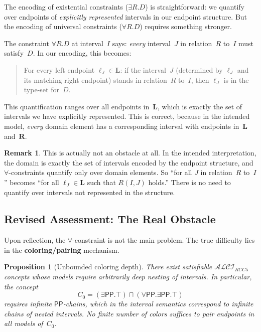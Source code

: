 \documentclass[a4paper,11pt]{article}
\newtheorem{proposition}[theorem]{Proposition}
\theoremstyle{definition}
\newtheorem{remark}[theorem]{Remark}
\newcommand{\ALCIRCC}[1]{\ensuremath{\mathcal{ALCI}_{\mathit{RCC#1}}}}
\newcommand{\PP}{\ensuremath{\mathsf{PP}}}
\begin{document}
The encoding of existential constraints ($\exists R.D$) is
straightforward: we quantify over endpoints of \emph{explicitly
represented} intervals in our endpoint structure.  But the encoding
of universal constraints ($\forall R.D$) requires something stronger.

The constraint $\forall R.D$ at interval~$I$ says: \emph{every}
interval~$J$ in relation~$R$ to~$I$ must satisfy~$D$.  In our
encoding, this becomes:

\begin{quote}
For every left endpoint $\ell_J \in \mathbf{L}$: if the interval~$J$
(determined by $\ell_J$ and its matching right endpoint) stands
in relation~$R$ to~$I$, then $\ell_J$ is in the type-set
for~$D$.
\end{quote}

This quantification ranges over all endpoints in~$\mathbf{L}$, which
is exactly the set of intervals we have explicitly represented.  This
is correct, because in the intended model, \emph{every} domain
element has a corresponding interval with endpoints in~$\mathbf{L}$
and~$\mathbf{R}$.

\begin{remark}
This is actually not an obstacle at all.  In the intended
interpretation, the domain is exactly the set of intervals encoded
by the endpoint structure, and $\forall$-constraints quantify only
over domain elements.  So ``for all $J$ in relation~$R$ to~$I$''
becomes ``for all $\ell_J \in \mathbf{L}$ such that $R(I,J)$
holds.''  There is no need to quantify over intervals not
represented in the structure.
\end{remark}

\subsection{Revised Assessment: The Real Obstacle}
\label{sec:real-obstacle}

Upon reflection, the $\forall$-constraint is not the main problem.
The true difficulty lies in the \textbf{coloring/pairing} mechanism.

\begin{proposition}[Unbounded coloring depth]
\label{prop:unbounded}
There exist satisfiable $\ALCIRCC{5}$ concepts whose models require
arbitrarily deep nesting of intervals. In particular, the concept
\[
  C_0 = (\exists \PP.\top) \sqcap (\forall \PP. \exists \PP.\top)
\]
requires infinite $\PP$-chains, which in the interval semantics
correspond to infinite chains of nested intervals.  No finite number
of colors suffices to pair endpoints in all models of~$C_0$.
\end{proposition}
\end{document}
